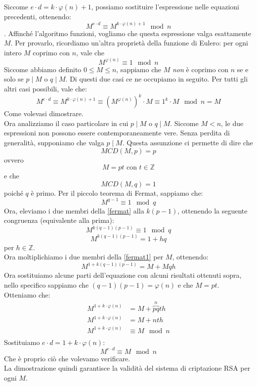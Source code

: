 \documentclass[italian,A4,12pt]{article}
\begin{document}
      Siccome $e\cdot d=k\cdot \varphi(n)+1$, possiamo sostituire l'espressione nelle equazioni precedenti, ottenendo:
      $$M^{e\cdot d}\equiv M^{k\cdot \varphi(n)+1} \mod{n}$$.
      Affinché l'algoritmo funzioni, vogliamo che questa espressione valga esattamente $M$. Per provarlo, ricordiamo un'altra proprietà della funzione di Eulero: per ogni intero $M$ coprimo con $n$, vale che
      $$M^{\varphi(n)}\equiv 1 \mod{n}$$
      Siccome abbiamo definito $0\leq M \leq n$, sappiamo che $M$ \textit{non} è coprimo con $n$ se e solo se $p\mid M$ o $q\mid M$. Di questi due casi ce ne occupiamo in seguito.
      Per tutti gli altri casi possibili, vale che:
      $$M^{e\cdot d}\equiv M^{k\cdot \varphi(n)+1}\equiv \left(M^{\varphi(n)}\right)^k\cdot M \equiv 1^k\cdot M \mod{n}=M$$
      Come volevasi dimostrare.\\
      Ora analizziamo il caso particolare in cui $p\mid M$ o $q\mid M$. Siccome $M<n$, le due espressioni non possono essere contemporaneamente vere. Senza perdita di generalità, supponiamo che valga $p\mid M$.
      Questa assunzione ci permette di dire che
      $$MCD(M,p)=p$$
      ovvero
      $$M=pt\text{ con }t\in\mathbb{Z}$$
      e che
      $$MCD(M,q)=1$$
      poiché $q$ è primo.
      Per il piccolo teorema di Fermat, sappiamo che:
      \begin{equation}
        M^{q-1}\equiv 1 \mod{q} \label{fermat}
      \end{equation}
      Ora, eleviamo i due membri della \eqref{fermat} alla $k(p-1)$, ottenendo la seguente congruenza (equivalente alla prima):
      $$M^{k(q-1)(p-1)}\equiv 1 \mod{q}$$
      \begin{equation}
          M^{k(q-1)(p-1)}=1+hq \label{fermat1}
      \end{equation}
      per $h\in\mathbb{Z}$.\\
      Ora moltiplichiamo i due membri della \eqref{fermat1} per $M$, ottenendo:
      $$M^{1+k(q-1)(p-1)}=M+Mqh$$
      Ora sostituiamo alcune parti dell'equazione con alcuni risultati ottenuti sopra, nello specifico sappiamo che $(q-1)(p-1)=\varphi(n)$ e che $M=pt$. Otteniamo che:
      \begin{align*}
        M^{1+k\cdot \varphi(n)}&=M+\overbrace{pq}^{n}th\\
        M^{1+k\cdot \varphi(n)}&=M+nth\\
        M^{1+k\cdot \varphi(n)}&\equiv M \mod{n}\\
      \end{align*}
      Sostituiamo $e\cdot d=1+k\cdot \varphi(n)$:
      $$M^{e\cdot d}\equiv M \mod{n}$$
      Che è proprio ciò che volevamo verificare.\\
      La dimostrazione quindi garantisce la validità del sistema di criptazione RSA per ogni $M$.
\end{document}
